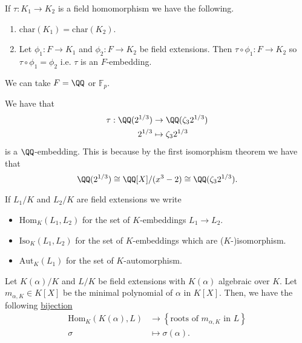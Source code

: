 \documentclass[12pt, a4paper]{article}
\newcommand{\Hom}{\text{Hom}}
\newcommand{\aut}{\text{Aut}}
\begin{document}
\begin{mdprop}
    If \(\tau:K_1\to K_2\) is a field homomorphism we have the following.
    \begin{enumerate}
        \item \(\text{char}(K_1)=\text{char}(K_2)\). 
        \item Let \(\phi_1 :F \to K_1\) and \(\phi_2: F \to K_2\) be field extensions. Then \(\tau \circ \phi_1 :F \to K_2\) so \(\tau\circ\phi_1=\phi_2\) i.e. \(\tau\) is an \(F\)-embedding.
    \end{enumerate}
\end{mdprop}

\begin{mdremark}
    We can take \(F=\QQ\) or \(\mathbb{F}_p\).
\end{mdremark}

\begin{mdexample}
    We have that 
    \[\begin{aligned}
        \tau: \QQ(2^{1/3}) &\to \QQ(\zeta_3 2^{1/3}) \\
        2^{1/3} &\mapsto \zeta_3 2^{1/3}
    \end{aligned}\]
    is a \(\QQ\)-embedding. This is because by the first isomorphism theorem we have that 
    \[\QQ(2^{1/3}) \cong \QQ[X]/(x^3-2) \cong  \QQ(\zeta_3 2^{1/3}).\]
\end{mdexample}

\begin{definition}
    If \(L_1/K\) and \(L_2/K\) are field extensions we write 
    \begin{itemize}
        \item \(\Hom_K(L_1,L_2)\) for the set of \(K\)-embeddings \(L_1\to L_2\). 
        \item \(\text{Iso}_K(L_1,L_2)\) for the set of \(K\)-embeddings which are (\(K\)-)isomorphism.
        \item \(\aut_K(L_1)\) for the set of \(K\)-automorphism.
    \end{itemize}
\end{definition}

\begin{mdthm}
    Let \(K(\alpha)/K\) and \(L/K\) be field extensions with \(K(\alpha)\) algebraic over \(K\). Let \(m_{\alpha,K} \in K[X]\) be the minimal polynomial of \(\alpha\) in \(K[X]\). Then, we have the following \ul{bijection} 
    \[\begin{aligned}
        \Hom_K(K(\alpha),L) &\to \left\{ \text{roots of \(m_{\alpha,K}\) in \(L\)} \right\} \\
        \sigma &\mapsto \sigma(\alpha).
    \end{aligned}\]
\end{mdthm}
\end{document}
